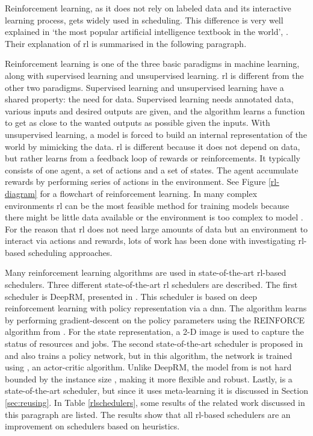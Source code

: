 Reinforcement learning, as it does not rely on labeled data and its
interactive learning process, gets widely used in scheduling. This difference
is very well explained in `the most popular artificial intelligence textbook
in the world'\footnotemark, . Their explanation of \gls{rl} is
summarised in the following paragraph.


Reinforcement learning is one of the three basic paradigms in machine
learning, along with supervised learning and unsupervised learning. \gls{rl} is
different from the other two paradigms. Supervised learning and unsupervised
learning have a shared property: the need for data. Supervised learning needs
annotated data, various inputs and desired outputs are given, and the
algorithm learns a function to get as close to the wanted outputs as possible
given the inputs. With unsupervised learning, a model is forced to build an
internal representation of the world by mimicking the data. \gls{rl} is different
because it does not depend on data, but rather learns from a feedback loop of
rewards or reinforcements. It typically consists of one agent, a set of
actions and a set of states. The agent accumulate rewards by performing series
of actions in the environment. See Figure \ref{rl-diagram} for a flowchart of
reinforcement learning. In many complex environments \gls{rl} can be the most
feasible method for training models because there might be little data
available or the environment is too complex to model \cite{russell2010}. For
the reason that \gls{rl} does not need large amounts of data but an environment to
interact via actions and rewards, lots of work has been done with
investigating \gls{rl}-based scheduling approaches.



Many reinforcement learning algorithms are used in state-of-the-art
\gls{rl}-based schedulers. Three different state-of-the-art \gls{rl}
schedulers are described. The first scheduler is DeepRM, presented in
. This scheduler is based on deep reinforcement learning with
policy representation via a \gls{dnn}. The algorithm learns by performing
gradient-descent on the policy parameters using the REINFORCE algorithm from
. For the state representation, a 2-D image is used to
capture the status of resources and jobs. The second state-of-the-art
scheduler is proposed in  and also trains a policy network,
but in this algorithm, the network is trained using \ppo, an actor-critic
algorithm. Unlike DeepRM, the model from  is not hard bounded
by the instance size \cite[p.~5]{zhang2020}, making it more flexible and
robust. Lastly,  is a state-of-the-art scheduler, but since it
uses meta-learning it is discussed in Section \ref{sec:reusing}. In Table
\ref{rlschedulers}, some results of the related work discussed in this
paragraph are listed. The results show that all \gls{rl}-based schedulers are
an improvement on schedulers based on heuristics.

